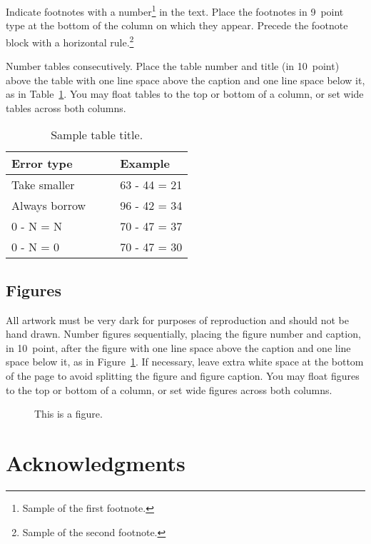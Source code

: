 \documentclass[10pt,letterpaper]{article}
\begin{document}
Indicate footnotes with a number\footnote{Sample of the first
footnote.} in the text. Place the footnotes in 9~point type at the
bottom of the column on which they appear. Precede the footnote block
with a horizontal rule.\footnote{Sample of the second footnote.}

Number tables consecutively. Place the table number and title (in
10~point) above the table with one line space above the caption and
one line space below it, as in Table~\ref{sample-table}. You may float
tables to the top or bottom of a column, or set wide tables across
both columns.

\begin{table}[!ht]
\begin{center} 
\caption{Sample table title.} 
\label{sample-table} 
\vskip 0.12in
\begin{tabular}{ll} 
\hline
Error type    &  Example \\
\hline
Take smaller        &   63 - 44 = 21 \\
Always borrow~~~~   &   96 - 42 = 34 \\
0 - N = N           &   70 - 47 = 37 \\
0 - N = 0           &   70 - 47 = 30 \\
\hline
\end{tabular} 
\end{center} 
\end{table}


\subsection{Figures}

All artwork must be very dark for purposes of reproduction and should
not be hand drawn. Number figures sequentially, placing the figure
number and caption, in 10~point, after the figure with one line space
above the caption and one line space below it, as in
Figure~\ref{sample-figure}. If necessary, leave extra white space at
the bottom of the page to avoid splitting the figure and figure
caption. You may float figures to the top or bottom of a column, or
set wide figures across both columns.

\begin{figure}[ht]
\begin{center}
\end{center}
\caption{This is a figure.} 
\label{sample-figure}
\end{figure}


\section{Acknowledgments}
\end{document}
